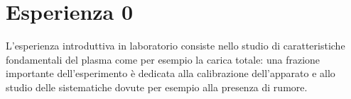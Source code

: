 \section{Esperienza 0}

L'esperienza introduttiva in laboratorio consiste nello studio di caratteristiche fondamentali del plasma come per esempio la 
carica totale: una frazione importante dell'esperimento è dedicata alla calibrazione dell'apparato e allo studio delle sistematiche
dovute per esempio alla presenza di rumore.
